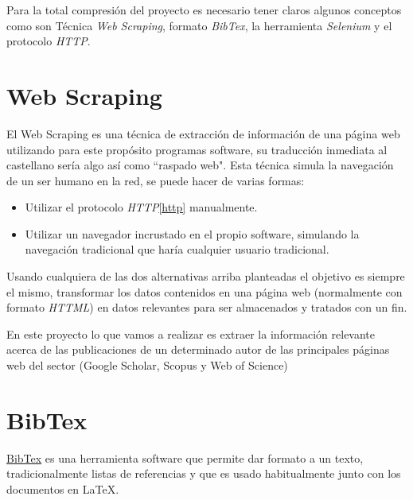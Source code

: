 
Para la total compresión del proyecto es necesario tener claros algunos conceptos como son Técnica \emph{Web Scraping}, formato \emph{BibTex}, la herramienta \emph{Selenium} y el protocolo \emph{HTTP}.

\section{Web Scraping}

El Web Scraping es una técnica de extracción de información de una página web utilizando para este propósito programas software, su traducción inmediata al castellano sería algo así como  ``raspado web".\cite{web_scraping}
Esta técnica simula la navegación de un ser humano en la red, se puede hacer de varias formas:
\begin{itemize}
	\item Utilizar el protocolo \emph{HTTP}\ref{http} manualmente.
	\item Utilizar un navegador incrustado en el propio software, simulando la navegación tradicional que haría cualquier usuario tradicional.
\end{itemize}

Usando cualquiera de las dos alternativas arriba planteadas el objetivo es siempre el mismo, transformar los datos contenidos en una página web (normalmente con formato \emph{HTTML}) en datos relevantes para ser almacenados y tratados con un fin.

En este proyecto lo que vamos a realizar es extraer la información relevante acerca de las publicaciones de un determinado autor de las principales páginas web del sector (Google Scholar, Scopus y Web of Science)

\section{BibTex}
\href {http://www.bibtex.org/}{BibTex} es una herramienta software que permite dar formato a un texto, tradicionalmente listas de referencias y que es usado habitualmente junto con los documentos en LaTeX\cite{bibtex}.

